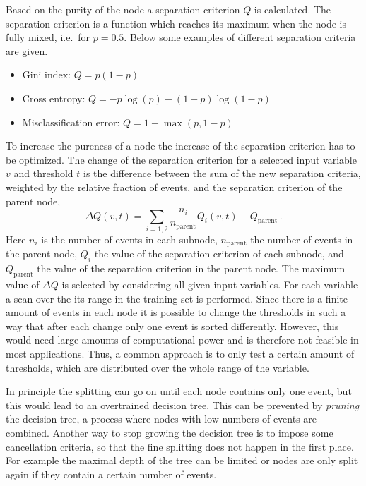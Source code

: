 Based on the purity of the node a separation criterion $Q$ is calculated.
The separation criterion is a function which reaches its maximum when the node is fully mixed, i.e.\ for $p = 0.5$.
Below some examples of different separation criteria are given.
\begin{itemize}
    \item Gini index: $Q = p (1-p)$
    \item Cross entropy: $Q = -p  \log(p) - (1 - p) \log (1 - p)$
    \item Misclassification error: $Q = 1 - \max (p, 1 - p)$
\end{itemize}
To increase the pureness of a node the increase of the separation criterion has to be optimized.
The change of the separation criterion for a selected input variable $v$ and threshold $t$
is the difference between the sum of the new separation criteria, weighted
by the relative fraction of events, and the separation criterion of the parent node,
\begin{equation}
    \label{eq:bdt:deltaQ}
    \Delta Q(v, t) = \sum_{i=1,2} \frac{n_i}{n_\text{parent}} Q_i (v, t) - Q_\text{parent} \,.
\end{equation}
Here $n_i$ is the number of events in each subnode, $n_\text{parent}$ the number of events in the parent node,
$Q_i$ the value of the separation criterion of each subnode, and $Q_\text{parent}$ the value of the separation criterion
in the parent node.
The maximum value of $\Delta Q$ is selected by considering all given input variables.
For each variable a scan over the its range in the training set is performed.
Since there is a finite amount of events in each node it is possible to change the thresholds in such a way that after
each change only one event is sorted differently.
However, this would need large amounts of computational power and is therefore not feasible in most applications.
Thus, a common approach is to only test a certain amount of thresholds, which are distributed over the whole range
of the variable.

In principle the splitting can go on until each node contains only one event, but this would lead
to an overtrained decision tree.
This can be prevented by \emph{pruning} the decision tree, a process where nodes with low numbers of events are combined.
Another way to stop growing the decision tree is to impose some cancellation criteria, so that the fine splitting
does not happen in the first place.
For example the maximal depth of the tree can be limited or nodes are only split again if they
contain a certain number of events.

